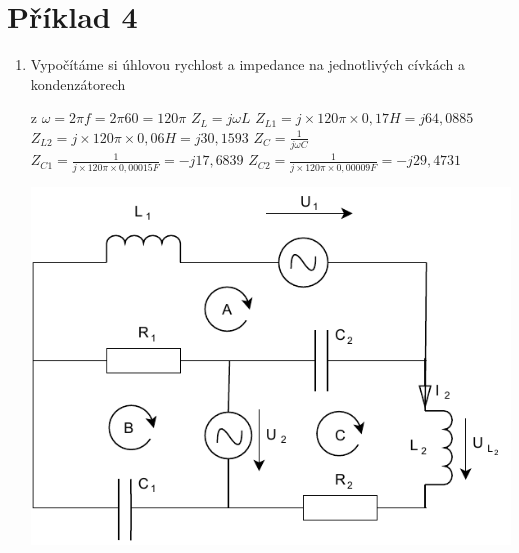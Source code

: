 \section{Příklad 4}

\begin{enumerate}
    \item Vypočítáme si úhlovou rychlost a impedance na jednotlivých cívkách a kondenzátorech \newline
    \begin{center}z
    $\omega = 2 \pi f = 2\pi60 = 120\pi$\newline\newline
    $Z_L = j \omega L$\newline\newline
    $Z_{L1} = j \times 120\pi \times 0,17 H =  j64,0885$\newline
    $Z_{L2} = j \times 120\pi \times 0,06 H = j30,1593$\newline\newline
    $Z_C = \frac{1}{j \omega C}$\newline\newline
    $Z_{C1} = \frac{1}{j \times 120\pi \times 0,00015 F } = -j17,6839$\newline
    $Z_{C2} = \frac{1}{j \times 120\pi \times 0,00009 F } = -j29,4731$\newline

    \includegraphics[scale=0.7]{pr4/pr4.pdf}\newline\newline
    

\end{center}
\end{enumerate}
